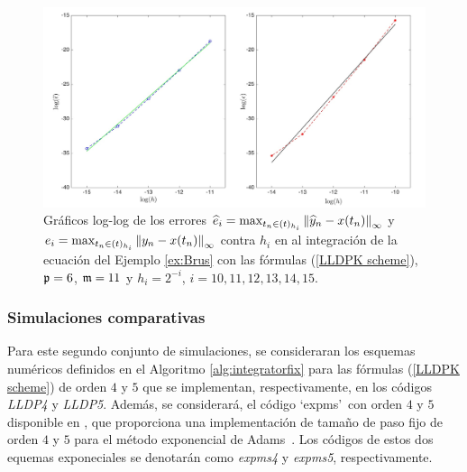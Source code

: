 \begin{figure}[htb]
	\begin{center}
		\includegraphics[scale=0.45]{Graphics/lldp/LLDP-plots.jpg}
		\caption{ Gráficos log-log de los errores $\widehat{e}_i=\max_{t_n\in(t)_{h_i}}\left\lVert \widehat{y}_n-x(t_n) \right\rVert_\infty$ y $e_i=\max_{t_n\in(t)_{h_i}}\left\lVert y_n-x(t_n) \right\rVert_\infty$ contra $h_i$ en al integración de la ecuación del Ejemplo \ref{ex:Brus} con las fórmulas (\ref{LLDPK scheme}), $\mathfrak{p}=6$, $\mathfrak{m}=11$ y $h_i=2^{-i}$, $i=10,11,12,13,14,15$.}
		\label{fig:num-exp-lldp-fix-step:Fig4}
	\end{center}
\end{figure}

\subsubsection{Simulaciones comparativas}
Para este segundo conjunto de simulaciones, se consideraran los esquemas numéricos definidos en el Algoritmo \ref{alg:integratorfix} para las fórmulas (\ref{LLDPK scheme}) de orden $4$ y $5$ que se implementan, respectivamente, en los códigos \emph{LLDP4} y \emph{LLDP5}. Además, se considerará, el código \textquoteleft expms\textquoteright~con orden $4$ y $5$ disponible en \cite{jansing2011expode}, que proporciona una implementación de tamaño de paso fijo de orden $4$ y $5$ para el método exponencial de Adams~\cite{hochbruck2011exponential}. Los códigos de estos dos equemas exponeciales se denotarán como \emph{expms4} y \emph{expms5}, respectivamente.

